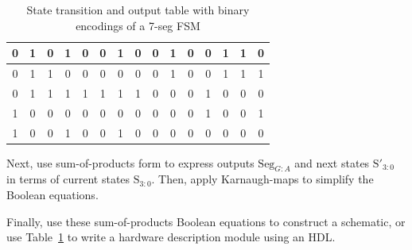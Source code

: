 \documentclass[12pt]{article}
\begin{document}
\begin{enumerate}
\begin{table}[ht]
\begin{tabular}{ | c | c | c | c || c | c | c | c | c | c | c || c | c | c | c | }
    0              & 1              & 0              & 1              & 0                         & 0                         & 1                         & 0                         & 0                         & 1                         & 0                         & 0               & 1               & 1               & 0               \\ \hline
    0              & 1              & 1              & 0              & 0                         & 0                         & 0                         & 0                         & 0                         & 1                         & 0                         & 0               & 1               & 1               & 1               \\ \hline
    0              & 1              & 1              & 1              & 1                         & 1                         & 1                         & 1                         & 0                         & 0                         & 0                         & 1               & 0               & 0               & 0               \\ \hline
    1              & 0              & 0              & 0              & 0                         & 0                         & 0                         & 0                         & 0                         & 0                         & 0                         & 1               & 0               & 0               & 1               \\ \hline
    1              & 0              & 0              & 1              & 0                         & 0                         & 1                         & 0                         & 0                         & 0                         & 0                         & 0               & 0               & 0               & 0               \\ \hline
    \end{tabular}
    \caption{State transition and output table with binary encodings of a 7-seg FSM}
    \label{table:4}
  \end{table}

  Next, use sum-of-products form to express outputs $\text{Seg}_{G:A}$ and next states $\text{S}'_{3:0}$ in terms of current states $\text{S}_{3:0}$. Then, apply Karnaugh-maps to simplify the Boolean equations.

  Finally, use these sum-of-products Boolean equations to construct a schematic, or use Table~\ref{table:4} to write a hardware description module using an HDL.
\end{enumerate}
\end{document}
